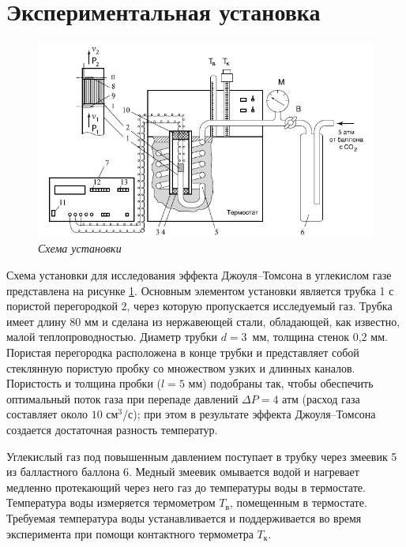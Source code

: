 \documentclass[a4paper,12pt]{article} %
\begin{document}
\section{Экспериментальная установка}

\begin{figure}[H]
	\begin{center}
		\includegraphics[width=18cm]{ust.jpg}
	\end{center}
	\caption{\textit{Схема установки}}
	\label{ust}
\end{figure}

Схема установки для исследования эффекта Джоуля–Томсона в углекислом газе представлена на рисунке \ref{ust}. Основным элементом установки является трубка 1 с пористой перегородкой 2, через которую пропускается исследуемый газ. Трубка имеет длину 80 мм и сделана из нержавеющей стали, обладающей, как известно, малой теплопроводностью. Диаметр трубки $ d = 3 $~мм, толщина стенок 0,2 мм. Пористая перегородка расположена в конце трубки и представляет собой стеклянную пористую пробку со множеством узких и длинных каналов. Пористость и толщина пробки ($ l = 5 $ мм) подобраны так, чтобы обеспечить оптимальный поток газа при перепаде давлений $ \Delta P = 4 $ атм (расход газа составляет около $ 10 $ см$ ^3 $/с); при этом в результате эффекта Джоуля–Томсона создается достаточная разность температур.

Углекислый газ под повышенным давлением поступает в трубку через змеевик 5 из балластного баллона 6. Медный змеевик омывается водой и нагревает медленно протекающий через него газ до температуры воды в термостате. Температура воды измеряется термометром $ T_\text{в} $, помещенным в термостате. Требуемая температура воды устанавливается и поддерживается во время эксперимента при помощи контактного термометра $ T_\text{к} $.
\end{document}

